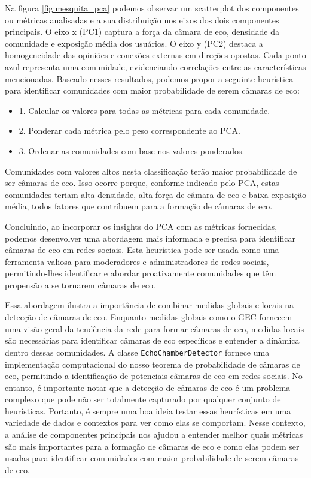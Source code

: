 Na figura \autoref{fig:mesquita_pca} podemos observar um scatterplot dos componentes ou métricas analisadas e a sua distribuição nos eixos dos dois componentes principais. O eixo x (PC1) captura a força da câmara de eco, densidade da comunidade e exposição média dos usuários. O eixo y (PC2) destaca a homogeneidade das opiniões e conexões externas em direções opostas. Cada ponto azul representa uma comunidade, evidenciando correlações entre as características mencionadas. Baseado nesses resultados, podemos propor a seguinte heurística para identificar comunidades com maior probabilidade de serem câmaras de eco:

\begin{itemize}
	\item 1. Calcular os valores para todas as métricas para cada comunidade.
	\item 2. Ponderar cada métrica pelo peso correspondente ao PCA.
	\item 3. Ordenar as comunidades com base nos valores ponderados.
\end{itemize}

Comunidades com valores altos nesta classificação terão maior probabilidade de ser câmaras de eco. Isso ocorre porque, conforme indicado pelo PCA, estas comunidades teriam alta densidade, alta força de câmara de eco e baixa exposição média, todos fatores que contribuem para a formação de câmaras de eco.

Concluindo, ao incorporar os insights do PCA com as métricas fornecidas, podemos desenvolver uma abordagem mais informada e precisa para identificar câmaras de eco em redes sociais. Esta heurística pode ser usada como uma ferramenta valiosa para moderadores e administradores de redes sociais, permitindo-lhes identificar e abordar proativamente comunidades que têm propensão a se tornarem câmaras de eco.

Essa abordagem ilustra a importância de combinar medidas globais e locais na detecção de câmaras de eco. Enquanto medidas globais como o GEC fornecem uma visão geral da tendência da rede para formar câmaras de eco, medidas locais são necessárias para identificar câmaras de eco específicas e entender a dinâmica dentro dessas comunidades. A classe \texttt{EchoChamberDetector} fornece uma implementação computacional do nosso teorema de probabilidade de câmaras de eco, permitindo a identificação de potenciais câmaras de eco em redes sociais. No entanto, é importante notar que a detecção de câmaras de eco é um problema complexo que pode não ser totalmente capturado por qualquer conjunto de heurísticas. Portanto, é sempre uma boa ideia testar essas heurísticas em uma variedade de dados e contextos para ver como elas se comportam. Nesse contexto, a análise de componentes principais nos ajudou a entender melhor quais métricas são mais importantes para a formação de câmaras de eco e como elas podem ser usadas para identificar comunidades com maior probabilidade de serem câmaras de eco.

